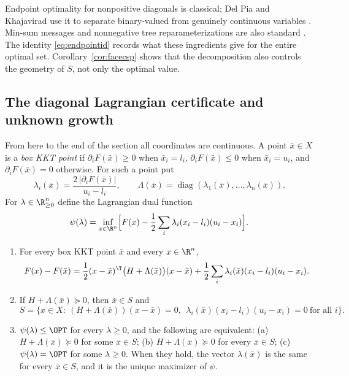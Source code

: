 Endpoint optimality for nonpositive diagonals is classical; Del Pia and
Khajavirad use it to separate binary-valued from genuinely continuous
variables \cite{DelPiaKhajavirad2026}. Min-sum messages and nonnegative tree
reparameterizations are also standard \cite{Dechter1999,WainwrightJaakkolaWillsky2005}.
The identity \eqref{eq:endpointid} records what these ingredients give for
the entire optimal set. Corollary~\ref{cor:facecsp} shows that the
decomposition also controls the geometry of $S$, not only the optimal value.

\subsection{The diagonal Lagrangian certificate and unknown growth}\label{sec:diagcert}

From here to the end of the section all coordinates are continuous. A point
$\bar x\in X$ is a \emph{box KKT point} if $\partial_iF(\bar x)\ge0$ when
$\bar x_i=l_i$, $\partial_iF(\bar x)\le0$ when $\bar x_i=u_i$, and
$\partial_iF(\bar x)=0$ otherwise. For such a point put
\[
\lambda_i(\bar x)=\frac{2\,|\partial_iF(\bar x)|}{u_i-l_i},\qquad
\Lambda(\bar x)=\operatorname{diag}(\lambda_1(\bar x),\ldots,\lambda_n(\bar x)).
\]
For $\lambda\in\R^n_{\ge0}$ define the Lagrangian dual function
\[
\psi(\lambda)=\inf_{x\in\R^n}\Bigl[F(x)-\frac12\sum_i\lambda_i(x_i-l_i)(u_i-x_i)\Bigr].
\]

\begin{lemma}\label{lem:diagcert}
\begin{enumerate}
\item[(i)] For every box KKT point $\bar x$ and every $x\in\R^n$,
\begin{equation}\label{eq:diagid}
F(x)-F(\bar x)=\frac12(x-\bar x)^{\T}\bigl(H+\Lambda(\bar x)\bigr)(x-\bar x)
+\frac12\sum_i\lambda_i(\bar x)(x_i-l_i)(u_i-x_i).
\end{equation}
\item[(ii)] If $H+\Lambda(\bar x)\succeq0$, then $\bar x\in S$ and
\begin{equation}\label{eq:diagset}
S=\bigl\{x\in X:\ (H+\Lambda(\bar x))(x-\bar x)=0,\ \
\lambda_i(\bar x)(x_i-l_i)(u_i-x_i)=0\ \text{for all }i\bigr\}.
\end{equation}
\item[(iii)] $\psi(\lambda)\le\OPT$ for every $\lambda\ge0$, and the
following are equivalent: (a) $H+\Lambda(\bar x)\succeq0$ for some
$\bar x\in S$; (b) $H+\Lambda(\bar x)\succeq0$ for every $\bar x\in S$;
(c) $\psi(\lambda)=\OPT$ for some $\lambda\ge0$. When they hold, the vector
$\lambda(\bar x)$ is the same for every $\bar x\in S$, and it is the unique
maximizer of $\psi$.
\end{enumerate}
\end{lemma}

